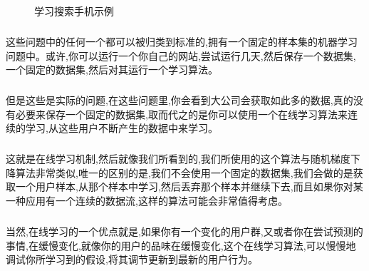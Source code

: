 \documentclass{article}
\begin{document}
\begin{CJK}{UTF8}{gbsn}
\begin{figure}[H]
\label{fig:11121}
\caption{学习搜索手机示例}
\end{figure}
\subparagraph{}
这些问题中的任何一个都可以被归类到标准的,拥有一个固定的样本集的机器学习问题中。或许,你可以运行一个你自己的网站,尝试运行几天,然后保存一个数据集,一个固定的数据集,然后对其运行一个学习算法。
\subparagraph{}
但是这些是实际的问题,在这些问题里,你会看到大公司会获取如此多的数据,真的没有必要来保存一个固定的数据集,取而代之的是你可以使用一个在线学习算法来连续的学习,从这些用户不断产生的数据中来学习。
\begin{figure}[H]
\label{fig:11122}
\end{figure}
\subparagraph{}
这就是在线学习机制,然后就像我们所看到的,我们所使用的这个算法与随机梯度下降算法非常类似,唯一的区别的是,我们不会使用一个固定的数据集,我们会做的是获取一个用户样本,从那个样本中学习,然后丢弃那个样本并继续下去,而且如果你对某一种应用有一个连续的数据流,这样的算法可能会非常值得考虑。
\subparagraph{}
当然,在线学习的一个优点就是,如果你有一个变化的用户群,又或者你在尝试预测的事情,在缓慢变化,就像你的用户的品味在缓慢变化,这个在线学习算法,可以慢慢地调试你所学习到的假设,将其调节更新到最新的用户行为。

\end{CJK}
\end{document}
